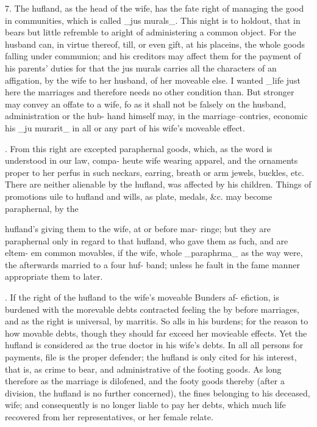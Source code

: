 7. The hufland, as the head of the wife, has the fate right of managing the good in communities, which is called \_jus murals\_. This night is to holdout, that in bears but little refremble to aright of administering a common object. For the husband can, in virtue thereof, till, or even gift, at his placeins, the whole goods falling under communion; and his creditors may affect them for the payment of his parents’ duties for that the jus murals carries all the characters of an affigation, by the wife to her husband, of her moveable else. I wanted \_life just here the marriages and therefore needs no other condition than. But stronger may convey an offate to a wife, fo as it shall not be falsely on the husband, administration or the hub- hand himself may, in the marriage–contries, economic his \_ju murarit\_ in all or any part of his wife’s moveable effect.\par{}. From this right are excepted paraphernal goods, which, as the word is understood in our law, compa- heute wife wearing apparel, and the ornaments proper to her perfus in such neckars, earring, breath or arm jewels, buckles, etc. There are neither alienable by the hufland, was affected by his children. Things of promotions uile to hufland and wills, as plate, medals, \&c. may become paraphernal, by the\par\medskip
hufland's giving them to the wife, at or before mar- ringe; but they are paraphernal only in regard to that hufland, who gave them as fuch, and are eltem- em common movables, if the wife, whole \_paraphrma\_ as the way were, the afterwards married to a four huf- band; unless he fault in the fame manner appropriate them to later.\par{}. If the right of the hufland to the wife’s moveable Bunders af- efiction, is burdened with the morevable debts contracted feeling the by before marriages, and as the right is universal, by marritis. So alls in his burdens; for the reason to how movable debts, though they should far exceed her movieable effects. Yet the hufland is considered as the true doctor in his wife’s debts. In all all persons for payments, file is the proper defender; the hufland is only cited for his interest, that is, as crime to bear, and administrative of the footing goods. As long therefore as the marriage is dilofened, and the footy goods thereby (after a division, the hufland is no further concerned), the fines belonging to his deceased, wife; and consequently is no longer liable to pay her debts, which much life recovered from her representatives, or her female relate.\par\medskip
